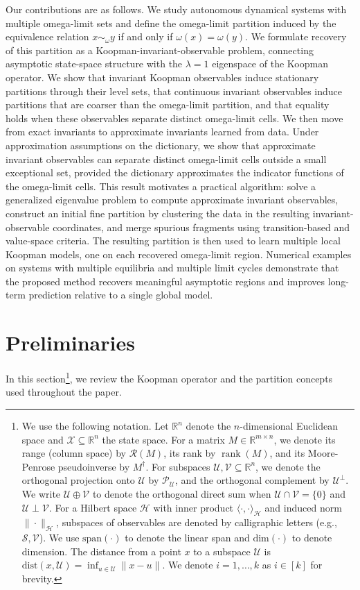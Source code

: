 \documentclass[letterpaper, 10 pt, conference]{ieeeconf}
\newcommand{\real}{\mathbb{R}}
\newcommand{\Hc}{\mathcal{H}}
\newcommand{\Pc}{\mathcal{P}}
\newcommand{\Sc}{\mathcal{S}}
\newcommand{\Uc}{\mathcal{U}}
\newcommand{\Vc}{\mathcal{V}}
\newcommand{\rank}[1]{\operatorname{rank}(#1)}
\begin{document}
Our contributions are as follows. We study autonomous dynamical systems with multiple omega-limit sets and define the omega-limit partition induced by the equivalence relation \(x\sim_\omega y\) if and only if \(\omega(x)=\omega(y)\). We formulate recovery of this partition as a Koopman-invariant-observable problem, connecting asymptotic state-space structure with the \(\lambda=1\) eigenspace of the Koopman operator. We show that invariant Koopman observables induce stationary partitions through their level sets, that continuous invariant observables induce partitions that are coarser than the omega-limit partition, and that equality holds when these observables separate distinct omega-limit cells. We then move from exact invariants to approximate invariants learned from data. Under approximation assumptions on the dictionary, we show that approximate invariant observables can separate distinct omega-limit cells outside a small exceptional set, provided the dictionary approximates the indicator functions of the omega-limit cells. This result motivates a practical algorithm: solve a generalized eigenvalue problem to compute approximate invariant observables, construct an initial fine partition by clustering the data in the resulting invariant-observable coordinates, and merge spurious fragments using transition-based and value-space criteria. The resulting partition is then used to learn multiple local Koopman models, one on each recovered omega-limit region. Numerical examples on systems with multiple equilibria and multiple limit cycles demonstrate that the proposed method recovers meaningful asymptotic regions and improves long-term prediction relative to a single global model.
\section{Preliminaries}

In this section\footnote{We use the following notation. Let $\real^n$
  denote the $n$-dimensional Euclidean space and
  $\mathcal{X} \subseteq \real^n$ the state space. For a matrix
  $M \in \real^{m \times n}$, we denote its range (column space) by
  $\mathcal{R}(M)$, its rank by $\rank{M}$, and its Moore-Penrose
  pseudoinverse by $M^\dagger$. For subspaces
  $\Uc, \Vc \subseteq \real^n$, we denote the orthogonal projection
  onto $\Uc$ by $\Pc_{\Uc}$, and the orthogonal complement by
  $\Uc^\perp$. We write $\Uc \oplus \Vc$ to denote the orthogonal
  direct sum when $\Uc \cap \Vc = \{0\}$ and $\Uc \perp \Vc$. For a
  Hilbert space $\Hc$ with inner product
  $\langle \cdot, \cdot \rangle_{\Hc}$ and induced norm
  $\|\cdot\|_{\Hc}$, subspaces of observables are denoted by
  calligraphic letters (e.g., $\Sc, \Vc$). We use $\text{span}(\cdot)$
  to denote the linear span and $\text{dim}(\cdot)$ to denote
  dimension. The distance from a point $x$ to a subspace $\Uc$ is
  $\text{dist}(x, \Uc) = \inf_{u \in \Uc} \|x - u\|$. We denote
  $i = 1 , \dots, k$ as $i \in [k]$ for brevity.  }, we review the
Koopman operator and the partition concepts used
throughout the paper.
\end{document}
